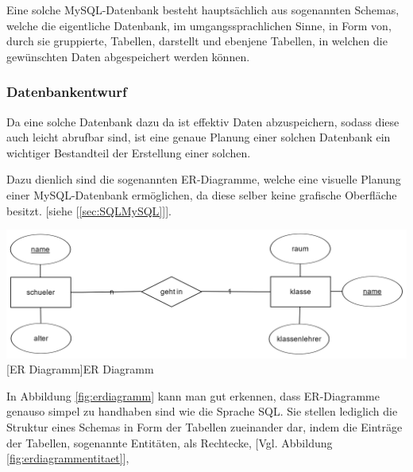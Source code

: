 \documentclass[12pt,a4paper,bibliography=totocnumbered,listof=totocnumbered]{scrartcl}
\begin{document}
\begin{minipage}{\linewidth}
Eine solche MySQL-Datenbank besteht hauptsächlich aus sogenannten \glqq Schemas\grqq{}, welche die eigentliche Datenbank, im umgangssprachlichen Sinne, in Form von, durch sie gruppierte, \glqq Tabellen\grqq{}, darstellt und ebenjene \glqq Tabellen\grqq{}, in welchen die gewünschten Daten abgespeichert werden können.

\subsubsection{Datenbankentwurf}
Da eine solche Datenbank\footnotemark{} dazu da ist effektiv Daten abzuspeichern, sodass diese auch leicht abrufbar sind, ist eine genaue Planung einer solchen Datenbank ein wichtiger Bestandteil der Erstellung einer solchen.


Dazu dienlich sind die sogenannten \glqq ER-Diagramme\grqq{}, welche eine visuelle Planung einer MySQL-Datenbank ermöglichen, da diese selber keine grafische Oberfläche besitzt. [siehe [\ref{sec:SQLMySQL}]].

\vspace{1em}
\begin{minipage}{\linewidth}
	\centering
	\includegraphics[width=1.0\linewidth]{Bilder/erdplus-diagram.png}
	[ER Diagramm]{ER Diagramm}
	\label{fig:erdiagramm}
\end{minipage}

In Abbildung \ref{fig:erdiagramm} 
kann man gut erkennen, dass ER-Diagramme genauso simpel zu handhaben sind wie die Sprache SQL.
Sie stellen lediglich die Struktur eines Schemas in Form der Tabellen zueinander dar, indem die Einträge der Tabellen, sogenannte Entitäten, als Rechtecke,  [Vgl. Abbildung \ref{fig:erdiagrammentitaet}], 


\end{minipage}
\end{document}
